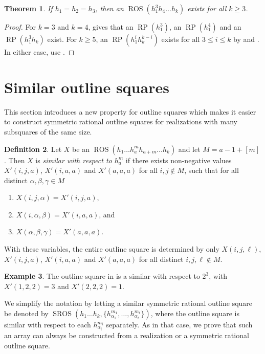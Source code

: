\documentclass[preprint,nonatbib]{elsarticle}
\DeclareMathOperator{\LS}{RP}
\DeclareMathOperator{\ROS}{ROS}
\DeclareMathOperator{\SROS}{SROS}
\newtheorem{theorem}{Theorem}[section]
\theoremstyle{definition}
\newtheorem{definition}[theorem]{Definition}
\newtheorem{example}[theorem]{Example}
\numberwithin{equation}{section}
\begin{document}
\begin{theorem}
    If $h_1=h_2=h_3$, then an $\ROS(h_1^3h_4\dots h_k)$ exists for all $k\geq 3$.
\end{theorem}
\begin{proof}
    For $k=3$ and $k=4$,  gives that an $\LS(h_1^3)$, an $\LS(h_1^4)$ and an $\LS(h_1^3h_k)$ exist. For $k\geq 5$, an $\LS(h_1^ih_k^{k-i})$ exists for all $3\leq i\leq k$ by  and . In either case, use .
\end{proof}



\section{Similar outline squares}

This section introduces a new property for outline squares which makes it easier to construct symmetric rational outline squares for realizations with many subsquares of the same size.

\begin{definition}
    Let $X$ be an $\ROS(h_1\dots h_a^m h_{a+m}\dots h_k)$ and let $M = a-1+[m]$. Then $X$ is \emph{similar with respect to $h_a^m$} if there exists non-negative values $X'(i,j,a)$, $X'(i,a,a)$ and $X'(a,a,a)$ for all $i,j\notin M$, such that for all distinct $\alpha,\beta,\gamma\in M$
\begin{enumerate}[label=\textup{(\arabic*)}]
    \item $X(i,j,\alpha) = X'(i,j,a)$,
    \item $X(i,\alpha,\beta) = X'(i,a,a)$, and
    \item $X(\alpha,\beta,\gamma) = X'(a,a,a)$.
\end{enumerate}
\end{definition}


    With these variables, the entire outline square is determined by only $X(i,j,\ell)$, $X'(i,j,a)$, $X'(i,a,a)$ and $X'(a,a,a)$ for all distinct $i,j,\ell\notin M$.
    

\begin{example}
    The outline square in  is a similar with respect to $2^3$, with $X'(1,2,2) = 3$ and $X'(2,2,2) = 1$.
\end{example}

\sloppy We simplify the notation by letting a similar symmetric rational outline square be denoted by $\SROS(h_1\dots h_k,\{h_{\alpha_1}^{m_1},\dots,h_{\alpha_\ell}^{m_\ell}\})$, where the outline square is similar with respect to each $h_{\alpha_i}^{m_i}$ separately. As in that case, we prove that such an array can always be constructed from a realization or a symmetric rational outline square.
\end{document}
